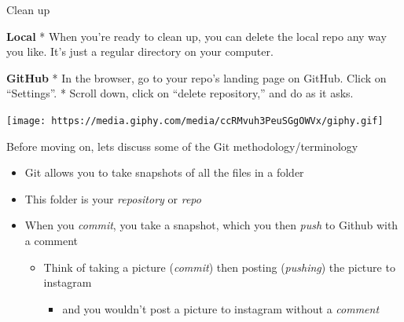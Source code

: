 \documentclass[
  ignorenonframetext,
]{beamer}
\providecommand{\tightlist}{%
  \setlength{\itemsep}{0pt}\setlength{\parskip}{0pt}}
\begin{document}
\begin{frame}{Clean up}
\protect\hypertarget{clean-up}{}

\textbf{Local} * When you're ready to clean up, you can delete the local
repo any way you like. It's just a regular directory on your computer.

\textbf{GitHub} * In the browser, go to your repo's landing page on
GitHub. Click on ``Settings''. * Scroll down, click on ``delete
repository,'' and do as it asks.

\end{frame}

\begin{frame}{}
\protect\hypertarget{section}{}

\texttt{[image: https://media.giphy.com/media/ccRMvuh3PeuSGgOWVx/giphy.gif]}

\end{frame}

\begin{frame}{Before moving on, lets discuss some of the Git
methodology/terminology}
\protect\hypertarget{before-moving-on-lets-discuss-some-of-the-git-methodologyterminology}{}

\begin{itemize}
\item
  Git allows you to take snapshots of all the files in a folder
\item
  This folder is your \emph{repository} or \emph{repo}
\item
  When you \emph{commit}, you take a snapshot, which you then
  \emph{push} to Github with a comment

  \begin{itemize}
  \tightlist
  \item
    Think of taking a picture (\emph{commit}) then posting
    (\emph{pushing}) the picture to instagram

    \begin{itemize}
    \tightlist
    \item
      and you wouldn't post a picture to instagram without a
      \emph{comment}
    \end{itemize}
  \end{itemize}
\end{itemize}

\end{frame}
\end{document}
